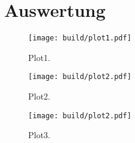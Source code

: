 \section{Auswertung}
\label{sec:Auswertung}
\begin{figure}
  \centering
  \texttt{[image: build/plot1.pdf]}
  \caption{Plot1.}
  \label{fig:plot1}
\end{figure}
\begin{figure}
  \centering
  \texttt{[image: build/plot2.pdf]}
  \caption{Plot2.}
  \label{fig:plot2}
\end{figure}
\begin{figure}
  \centering
  \texttt{[image: build/plot2.pdf]}
  \caption{Plot3.}
  \label{fig:plot3}
\end{figure}
